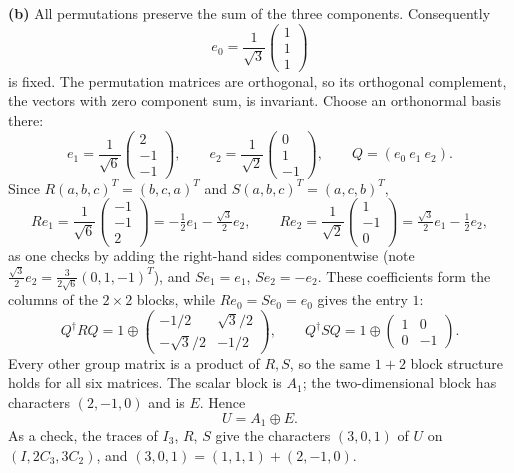 \textbf{(b)} All permutations preserve the sum of the three
components. Consequently
\[
e_0=\frac1{\sqrt3}\begin{pmatrix}1\\1\\1\end{pmatrix}
\]
is fixed. The permutation matrices are orthogonal, so its
orthogonal complement, the vectors with zero component sum, is
invariant. Choose an orthonormal basis there:
\[
e_1=\frac1{\sqrt6}\begin{pmatrix}2\\-1\\-1\end{pmatrix},\qquad
e_2=\frac1{\sqrt2}\begin{pmatrix}0\\1\\-1\end{pmatrix},
\qquad Q=(e_0\ e_1\ e_2).
\]
Since $R(a,b,c)^T=(b,c,a)^T$ and $S(a,b,c)^T=(a,c,b)^T$,
\[
Re_1=\frac1{\sqrt6}\begin{pmatrix}-1\\-1\\2\end{pmatrix}
=-\tfrac12e_1-\tfrac{\sqrt3}{2}e_2,\qquad
Re_2=\frac1{\sqrt2}\begin{pmatrix}1\\-1\\0\end{pmatrix}
=\tfrac{\sqrt3}{2}e_1-\tfrac12e_2,
\]
as one checks by adding the right-hand sides componentwise
(note $\tfrac{\sqrt3}{2}e_2=\tfrac{3}{2\sqrt6}(0,1,-1)^T$), and
$Se_1=e_1$, $Se_2=-e_2$. These coefficients form the columns of the
$2\times2$ blocks, while $Re_0=Se_0=e_0$ gives the entry $1$:
\[
Q^\dagger RQ=
1\oplus\begin{pmatrix}-1/2&\sqrt3/2\\-\sqrt3/2&-1/2\end{pmatrix},
\qquad
Q^\dagger SQ=1\oplus\begin{pmatrix}1&0\\0&-1\end{pmatrix}.
\]
Every other group matrix is a product of $R,S$, so the same
$1+2$ block structure holds for all six matrices.
The scalar block is $A_1$; the two-dimensional block has characters
$(2,-1,0)$ and is $E$. Hence
\[
\boxed{U=A_1\oplus E}.
\]
As a check, the traces of $I_3$, $R$, $S$ give the characters
$(3,0,1)$ of $U$ on $(I,2C_3,3C_2)$, and
$(3,0,1)=(1,1,1)+(2,-1,0)$.

